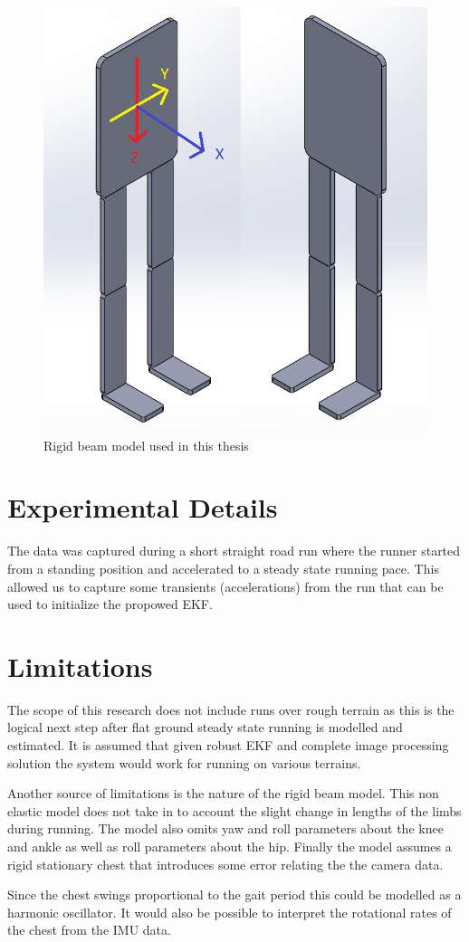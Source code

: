 \begin{figure}[!ht] 
\captionsetup{width=0.8\linewidth, font=small}  
\includegraphics[width=0.8\linewidth]{figures/swmodel.png}
\caption{Rigid beam model used in this thesis}
\label{fig:swmodel}
\end{figure}


\section{Experimental Details}
The data was captured during a short straight road run where the runner started from a standing position and accelerated to a steady state running pace. This allowed us to capture some transients (accelerations) from the run that can be used to initialize the propowed EKF.

\section{Limitations}
The scope of this research does not include runs over rough terrain as this is the logical next step after flat ground steady state running is modelled and estimated. It is assumed that given robust EKF and complete image processing solution the system would work for running on various terrains.

Another source of limitations is the nature of the rigid beam model. This non elastic model does not take in to account the slight change in lengths of the limbs during running. The model also omits yaw and roll parameters about the knee and ankle as well as roll parameters about the hip. Finally the model assumes a rigid stationary chest that introduces some error relating the the camera data.

Since the chest swings proportional to the gait period this could be modelled as a harmonic oscillator. It would also be possible to interpret the rotational rates of the chest from the IMU data.







 



















